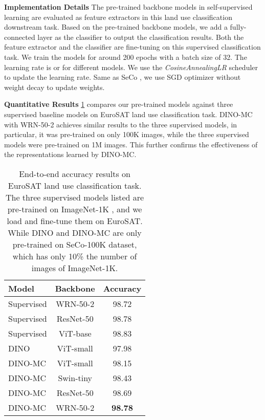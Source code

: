 \documentclass[10pt,twocolumn,letterpaper]{article}
\begin{document}
\textbf{Implementation Details }
The pre-trained backbone models in self-supervised learning are evaluated as feature extractors in this land use classification downstream task.
Based on the pre-trained backbone models, we add a fully-connected layer as the classifier to output the classification results.
Both the feature extractor and the classifier are fine-tuning on this supervised classification task.
We train the models for around 200 epochs with a batch size of 32.
The learning rate is  or  for different models.
We use the \textit{CosineAnnealingLR} scheduler to update the learning rate.
Same as SeCo \cite{manas2021seasonal}, we use SGD optimizer without weight decay to update weights.

\textbf{Quantitative Results}
\cref{table:EuroSAT_results} compares our pre-trained models against three supervised baseline models on EuroSAT land use classification task.
DINO-MC with WRN-50-2 achieves similar results to the three supervised models, in particular, it was pre-trained on only 100K images, while the three supervised models were pre-trained on 1M images.
This further confirms the effectiveness of the representations learned by DINO-MC.

\begin{table}
  \centering
  \begin{tabular}{lcc}
    \toprule
    Model & Backbone & Accuracy \\
    \midrule
    Supervised & WRN-50-2 & 98.72 \\
    Supervised & ResNet-50 & 98.78 \\
    Supervised & ViT-base & 98.83 \\
    \midrule
DINO & ViT-small & 97.98 \\
DINO-MC  & ViT-small & 98.15 \\
DINO-MC  & Swin-tiny & 98.43 \\
    DINO-MC  & ResNet-50 & 98.69 \\
    DINO-MC  & WRN-50-2 & \textbf{98.78} \\
    \bottomrule
  \end{tabular}
  \caption{
  End-to-end accuracy results on EuroSAT land use classification task.
  The three supervised models listed are pre-trained on ImageNet-1K \cite{russakovsky2015imagenet}, and we load and fine-tune them on EuroSAT.
  While DINO and DINO-MC are only pre-trained on SeCo-100K dataset, which has only 10\% the number of images of ImageNet-1K.
  }
  \label{table:EuroSAT_results}
\end{table}
\end{document}
